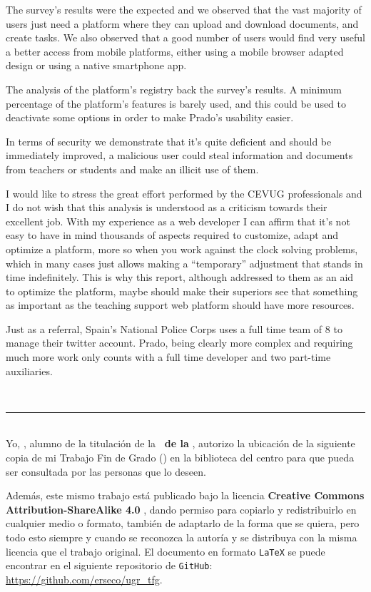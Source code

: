 {{\bigskip
The survey’s results were the expected and we observed that the vast majority of users just need a platform where they can upload and download documents, and create tasks. We also observed that a good number of users would find very useful a better access from mobile platforms, either using a mobile browser adapted design or using a native smartphone app.

\bigskip
The analysis of the platform’s registry back the survey’s results. A minimum percentage of the platform’s features is barely used, and this could be used to deactivate some options in order to make Prado’s usability easier.

\bigskip
In terms of security we demonstrate that it’s quite deficient and should be immediately improved, a malicious user could steal information and documents from teachers or students and make an illicit use of them.

\bigskip
I would like to stress the great effort performed by the CEVUG professionals and I do not wish that this analysis is understood as a criticism towards their excellent job. With my experience as a web developer I can affirm that it’s not easy to have in mind thousands of aspects required to customize, adapt and optimize a platform, more so when you work against the clock solving problems, which in many cases just allows making a “temporary” adjustment that stands in time indefinitely. This is why this report, although addressed to them as an aid to optimize the platform, maybe should make their superiors see that something as important as the teaching support web platform should have more resources.

\bigskip
Just as a referral, Spain’s National Police Corps uses a full time team of 8 to manage their twitter account. Prado, being clearly more complex and requiring much more work only counts with a full time developer and two part-time auxiliaries. 


\newpage
\thispagestyle{empty}
\
\vspace{3cm}

\noindent\rule[-1ex]{\textwidth}{2pt}\\[4.5ex]

Yo, \textbf{\autor}, alumno de la titulación \textbf{\grado} de la \textbf{\escuela\ de la \universidad}, autorizo la ubicación de la siguiente copia de mi Trabajo Fin de Grado (\textit{\titulo}) en la biblioteca del centro para que pueda ser consultada por las personas que lo deseen.

\bigskip
Además, este mismo trabajo está publicado bajo la licencia \textbf{Creative Commons Attribution-ShareAlike 4.0} \cite{CC}, dando permiso para copiarlo y redistribuirlo en cualquier medio o formato, también de adaptarlo de la forma que se quiera, pero todo esto siempre y cuando se reconozca la autoría y se distribuya con la misma licencia que el trabajo original. El documento en formato {\tt LaTeX} se puede encontrar en el siguiente repositorio de {\tt GitHub}: \url{https://github.com/erseco/ugr_tfg}.

}}
